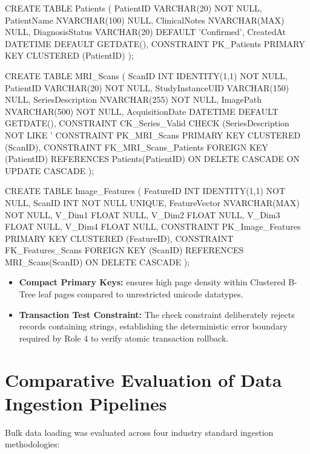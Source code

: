 \begin{SQLCode}
CREATE TABLE Patients (
    PatientID VARCHAR(20) NOT NULL,
    PatientName NVARCHAR(100) NULL,
    ClinicalNotes NVARCHAR(MAX) NULL,
    DiagnosisStatus VARCHAR(20) DEFAULT 'Confirmed',
    CreatedAt DATETIME DEFAULT GETDATE(),
    CONSTRAINT PK_Patients PRIMARY KEY CLUSTERED (PatientID)
);

CREATE TABLE MRI_Scans (
    ScanID INT IDENTITY(1,1) NOT NULL,
    PatientID VARCHAR(20) NOT NULL,
    StudyInstanceUID VARCHAR(150) NULL,
    SeriesDescription NVARCHAR(255) NOT NULL,
    ImagePath NVARCHAR(500) NOT NULL,
    AcquisitionDate DATETIME DEFAULT GETDATE(),
    CONSTRAINT CK_Series_Valid CHECK (SeriesDescription NOT LIKE '%
    CONSTRAINT PK_MRI_Scans PRIMARY KEY CLUSTERED (ScanID),
    CONSTRAINT FK_MRI_Scans_Patients FOREIGN KEY (PatientID) 
        REFERENCES Patients(PatientID) ON DELETE CASCADE ON UPDATE CASCADE
);

CREATE TABLE Image_Features (
    FeatureID INT IDENTITY(1,1) NOT NULL,
    ScanID INT NOT NULL UNIQUE,
    FeatureVector NVARCHAR(MAX) NOT NULL,
    V_Dim1 FLOAT NULL, V_Dim2 FLOAT NULL, V_Dim3 FLOAT NULL, V_Dim4 FLOAT NULL,
    CONSTRAINT PK_Image_Features PRIMARY KEY CLUSTERED (FeatureID),
    CONSTRAINT FK_Features_Scans FOREIGN KEY (ScanID) REFERENCES MRI_Scans(ScanID) ON DELETE CASCADE
);
\end{SQLCode}

\begin{itemize}
    \item \textbf{Compact Primary Keys:}  ensures high page density within Clustered B-Tree leaf pages compared to unrestricted unicode datatypes.
    \item \textbf{Transaction Test Constraint:} The check constraint  deliberately rejects records containing  strings, establishing the deterministic error boundary required by Role 4 to verify atomic transaction rollback.
\end{itemize}

\section{Comparative Evaluation of Data Ingestion Pipelines}
Bulk data loading was evaluated across four industry standard ingestion methodologies:

